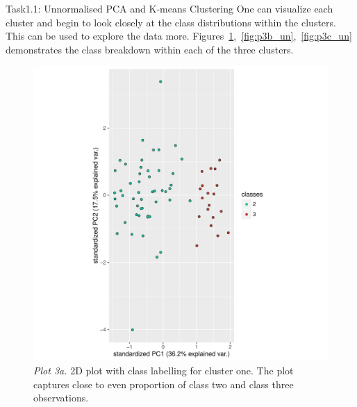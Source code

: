 \documentclass[11pt]{article}
\begin{document}
\begin{subsection}{Task1.1: Unnormalised PCA and K-means Clustering}
One can visualize each cluster and begin to look closely at the class distributions within the clusters. This can be used to explore the data more. Figures~\ref{fig:p3a_un},~\ref{fig:p3b_un},~\ref{fig:p3c_un} demonstrates the class breakdown within each of the three clusters.
\begin{figure}[H]
    \centering
    \includegraphics[width=1.0\textwidth]{p3a_un}
    \caption{\textit{Plot 3a.} 2D plot with class labelling for cluster one. The plot captures close to even proportion of class two and class three observations.}
    \label{fig:p3a_un}
\end{figure}


\end{subsection}
\end{document}
